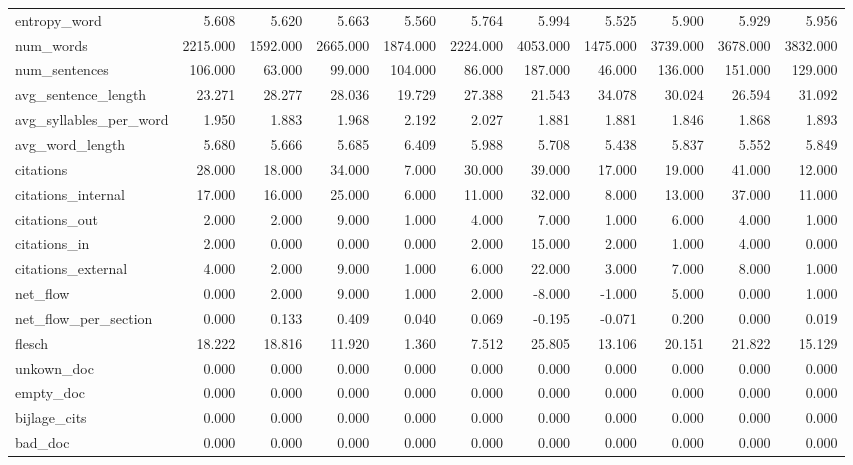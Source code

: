 \begin{tabular}{lrrrrrrrrrr}
\cline{1-11}
entropy\_word & 5.608 & 5.620 & 5.663 & 5.560 & 5.764 & 5.994 & 5.525 & 5.900 & 5.929 & 5.956 \\
\cline{1-11}
num\_words & 2215.000 & 1592.000 & 2665.000 & 1874.000 & 2224.000 & 4053.000 & 1475.000 & 3739.000 & 3678.000 & 3832.000 \\
\cline{1-11}
num\_sentences & 106.000 & 63.000 & 99.000 & 104.000 & 86.000 & 187.000 & 46.000 & 136.000 & 151.000 & 129.000 \\
\cline{1-11}
avg\_sentence\_length & 23.271 & 28.277 & 28.036 & 19.729 & 27.388 & 21.543 & 34.078 & 30.024 & 26.594 & 31.092 \\
\cline{1-11}
avg\_syllables\_per\_word & 1.950 & 1.883 & 1.968 & 2.192 & 2.027 & 1.881 & 1.881 & 1.846 & 1.868 & 1.893 \\
\cline{1-11}
avg\_word\_length & 5.680 & 5.666 & 5.685 & 6.409 & 5.988 & 5.708 & 5.438 & 5.837 & 5.552 & 5.849 \\
\cline{1-11}
citations & 28.000 & 18.000 & 34.000 & 7.000 & 30.000 & 39.000 & 17.000 & 19.000 & 41.000 & 12.000 \\
\cline{1-11}
citations\_internal & 17.000 & 16.000 & 25.000 & 6.000 & 11.000 & 32.000 & 8.000 & 13.000 & 37.000 & 11.000 \\
\cline{1-11}
citations\_out & 2.000 & 2.000 & 9.000 & 1.000 & 4.000 & 7.000 & 1.000 & 6.000 & 4.000 & 1.000 \\
\cline{1-11}
citations\_in & 2.000 & 0.000 & 0.000 & 0.000 & 2.000 & 15.000 & 2.000 & 1.000 & 4.000 & 0.000 \\
\cline{1-11}
citations\_external & 4.000 & 2.000 & 9.000 & 1.000 & 6.000 & 22.000 & 3.000 & 7.000 & 8.000 & 1.000 \\
\cline{1-11}
net\_flow & 0.000 & 2.000 & 9.000 & 1.000 & 2.000 & -8.000 & -1.000 & 5.000 & 0.000 & 1.000 \\
\cline{1-11}
net\_flow\_per\_section & 0.000 & 0.133 & 0.409 & 0.040 & 0.069 & -0.195 & -0.071 & 0.200 & 0.000 & 0.019 \\
\cline{1-11}
flesch & 18.222 & 18.816 & 11.920 & 1.360 & 7.512 & 25.805 & 13.106 & 20.151 & 21.822 & 15.129 \\
\cline{1-11}
unkown\_doc & 0.000 & 0.000 & 0.000 & 0.000 & 0.000 & 0.000 & 0.000 & 0.000 & 0.000 & 0.000 \\
\cline{1-11}
empty\_doc & 0.000 & 0.000 & 0.000 & 0.000 & 0.000 & 0.000 & 0.000 & 0.000 & 0.000 & 0.000 \\
\cline{1-11}
bijlage\_cits & 0.000 & 0.000 & 0.000 & 0.000 & 0.000 & 0.000 & 0.000 & 0.000 & 0.000 & 0.000 \\
\cline{1-11}
bad\_doc & 0.000 & 0.000 & 0.000 & 0.000 & 0.000 & 0.000 & 0.000 & 0.000 & 0.000 & 0.000 \\
\cline{1-11}
\bottomrule
\end{tabular}

